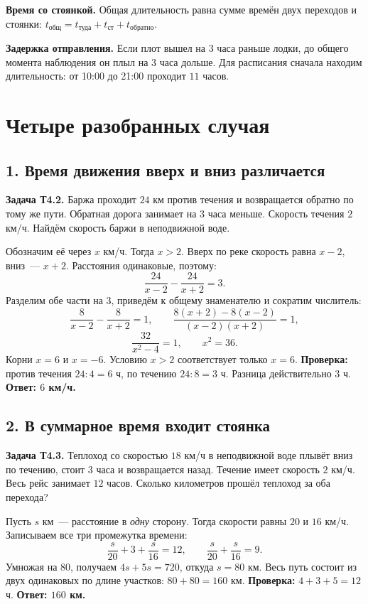 \documentclass[a4paper,12pt]{article}
\newcommand{\important}[1]{\textcolor{darkaccent}{\textbf{#1}}}
\begin{document}
\important{Время со стоянкой.} Общая длительность равна сумме времён двух переходов и стоянки: $t_{\text{общ}}=t_{\text{туда}}+t_{\text{ст}}+t_{\text{обратно}}$.

\important{Задержка отправления.} Если плот вышел на $3$ часа раньше лодки, до общего момента наблюдения он плыл на $3$ часа дольше. Для расписания сначала находим длительность: от 10:00 до 21:00 проходит $11$ часов.

\section{Четыре разобранных случая}
\subsection{1. Время движения вверх и вниз различается}
\textbf{Задача Т4.2.} Баржа проходит $24$ км против течения и возвращается обратно по тому же пути. Обратная дорога занимает на $3$ часа меньше. Скорость течения $2$ км/ч. Найдём скорость баржи в неподвижной воде.

Обозначим её через $x$ км/ч. Тогда $x>2$. Вверх по реке скорость равна $x-2$, вниз~--- $x+2$. Расстояния одинаковые, поэтому:
\[
\frac{24}{x-2}-\frac{24}{x+2}=3.
\]
Разделим обе части на $3$, приведём к общему знаменателю и сократим числитель:
\[
\frac{8}{x-2}-\frac{8}{x+2}=1,\qquad
\frac{8(x+2)-8(x-2)}{(x-2)(x+2)}=1,
\]
\[
\frac{32}{x^2-4}=1,\qquad x^2=36.
\]
Корни $x=6$ и $x=-6$. Условию $x>2$ соответствует только $x=6$.
\textbf{Проверка:} против течения $24:4=6$ ч, по течению $24:8=3$ ч. Разница действительно $3$ ч. \important{Ответ: $6$ км/ч.}

\subsection{2. В суммарное время входит стоянка}
\textbf{Задача Т4.3.} Теплоход со скоростью $18$ км/ч в неподвижной воде плывёт вниз по течению, стоит $3$ часа и возвращается назад. Течение имеет скорость $2$ км/ч. Весь рейс занимает $12$ часов. Сколько километров прошёл теплоход за оба перехода?

Пусть $s$ км~--- расстояние в \emph{одну} сторону. Тогда скорости равны $20$ и $16$ км/ч. Записываем все три промежутка времени:
\[
\frac{s}{20}+3+\frac{s}{16}=12,
\qquad \frac{s}{20}+\frac{s}{16}=9.
\]
Умножая на $80$, получаем $4s+5s=720$, откуда $s=80$ км. Весь путь состоит из двух одинаковых по длине участков: $80+80=160$ км.
\textbf{Проверка:} $4+3+5=12$ ч. \important{Ответ: $160$ км.}
\end{document}
